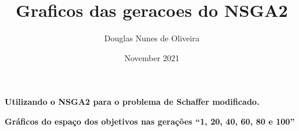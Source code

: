 \documentclass[11pt, a4paper]{report}
\title{Graficos das geracoes do NSGA2}
\author{Douglas Nunes de Oliveira}
\date{November 2021}
\begin{document}
    \begin{center}
        \textbf{Utilizando o NSGA2 para o problema de Schaffer modificado.}
        
        \textbf{Gráficos do espaço dos objetivos nas gerações ``1, 20, 40, 60, 80 e 100''}
        
        
    \end{center}
    

    
    \hrulefill
    

    \newpage

    
    \hrulefill
    
    
    \newpage
    
    \hrulefill
    
    
    \newpage
    
    \hrulefill
\end{document}
